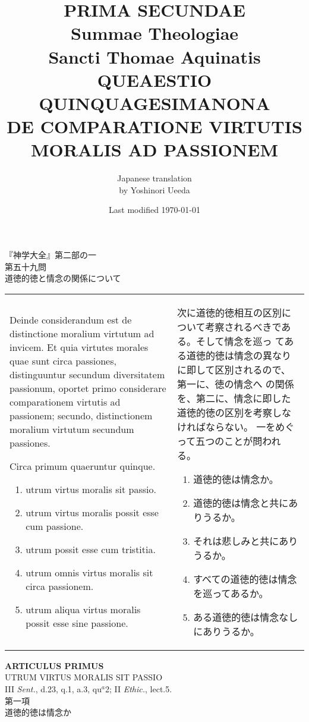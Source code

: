 \documentclass[10pt]{jsarticle}
\title{{\bf PRIMA SECUNDAE}\\{\HUGE Summae Theologiae}\\Sancti Thomae
Aquinatis\\{\sffamily QUEAESTIO QUINQUAGESIMANONA}\\DE COMPARATIONE VIRTUTIS MORALIS AD PASSIONEM}
\author{Japanese translation\\by Yoshinori {\sc Ueeda}}
\date{Last modified \today}
\begin{document}
\maketitle
\thispagestyle{empty}

\begin{center}
{\LARGE 『神学大全』第二部の一}\\
{\Large 第五十九問\\道徳的徳と情念の関係について}
\end{center}

\begin{longtable}{p{21em}p{21em}}
 Deinde considerandum est de distinctione moralium virtutum ad
 invicem. Et quia virtutes morales quae sunt circa passiones,
 distinguuntur secundum diversitatem passionum, oportet primo
 considerare comparationem virtutis ad passionem; secundo,
 distinctionem moralium virtutum secundum passiones.


 Circa primum quaeruntur quinque. 
  
\begin{enumerate}
 \item utrum virtus moralis sit passio.
 \item utrum virtus moralis possit esse cum passione.
 \item utrum possit esse cum tristitia.
 \item utrum omnis virtus moralis sit circa passionem.
 \item utrum aliqua virtus moralis possit esse sine passione.
\end{enumerate}

&

 次に道徳的徳相互の区別について考察されるべきである。そして情念を巡っ
てある道徳的徳は情念の異なりに即して区別されるので、第一に、徳の情念へ
の関係を、第二に、情念に即した道徳的徳の区別を考察しなければならない。
一をめぐって五つのことが問われる。

\begin{enumerate}
 \item 道徳的徳は情念か。
 \item 道徳的徳は情念と共にありうるか。
 \item それは悲しみと共にありうるか。
 \item すべての道徳的徳は情念を巡ってあるか。
 \item ある道徳的徳は情念なしにありうるか。
\end{enumerate}
\end{longtable}
\newpage
{}
\begin{center}
{\Large {\bf ARTICULUS PRIMUS}}\\
{\large UTRUM VIRTUS MORALIS SIT PASSIO}\\
{\footnotesize III {\itshape Sent.}, d.23, q.1, a.3, qu$^{a}$2; II {\itshape Ethic.}, lect.5.}\\
{\Large 第一項\\道徳的徳は情念か}
\end{center}
\end{document}
